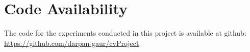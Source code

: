 \section{Code Availability}
\label{sec:code_avail}

The code for the experiments conducted in this project is available at github: \url{https://github.com/darpan-gaur/cvProject}.